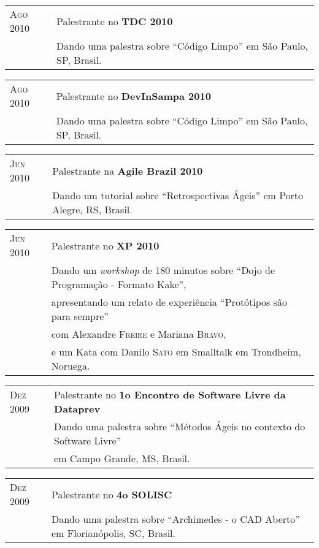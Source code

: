 \documentclass[letter,10pt]{article}
\begin{document}
\begin{tabular}{p{2.5cm}l}
  \textsc{Ago 2010} & Palestrante no \textbf{TDC 2010}\\
  &Dando uma palestra sobre ``Código Limpo'' em São Paulo, SP, Brasil.\\
\end{tabular}

\begin{tabular}{p{2.5cm}l}
  \textsc{Ago 2010} & Palestrante no \textbf{DevInSampa 2010}\\
  &Dando uma palestra sobre ``Código Limpo'' em São Paulo, SP, Brasil.\\
\end{tabular}

\begin{tabular}{p{2.5cm}l}
  \textsc{Jun 2010} & Palestrante na \textbf{Agile Brazil 2010}\\
  &Dando um tutorial sobre ``Retrospectivas Ágeis'' em Porto Alegre, RS, Brasil.\\
\end{tabular}

\begin{tabular}{p{2.5cm}l}
  \textsc{Jun 2010} & Palestrante no \textbf{XP 2010}\\
  &Dando um \textit{workshop} de 180 minutos sobre ``Dojo de
  Programação - Formato Kake'',\\
  & apresentando um relato de experiência ``Protótipos são para sempre''\\
  & com Alexandre \textsc{Freire} e Mariana \textsc{Bravo},\\
  & e um Kata com Danilo \textsc{Sato} em Smalltalk em Trondheim, Noruega.\\
\end{tabular}

\begin{tabular}{p{2.5cm}l}
  \textsc{Dez 2009} & Palestrante no \textbf{1o Encontro de Software
    Livre da Dataprev}\\
  &Dando uma palestra sobre ``Métodos Ágeis no contexto do Software Livre''\\
  &em Campo Grande, MS, Brasil.\\
\end{tabular}

\begin{tabular}{p{2.5cm}l}
  \textsc{Dez 2009} & Palestrante no \textbf{4o SOLISC}\\
  &Dando uma palestra sobre ``Archimedes - o CAD Aberto'' em Florianópolis, SC, Brasil.\\
\end{tabular}
\end{document}
